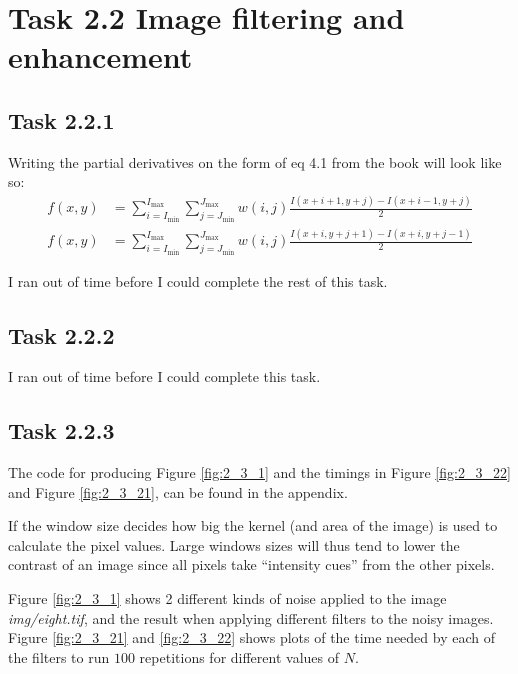\section{Task 2.2 Image filtering and enhancement}

\subsection{Task 2.2.1}

Writing the partial derivatives on the form of eq 4.1 from the book will look
like so:
\begin{align}
  f(x,y) &=
    \sum_{i=I_\text{min}}^{I_\text{max}}
    \sum_{j=J_\text{min}}^{J_\text{max}} w(i,j)
    \frac{I(x+i+1,y+j) - I(x+i-1,y+j)}{2} \\
  f(x,y) &=
    \sum_{i=I_\text{min}}^{I_\text{max}}
    \sum_{j=J_\text{min}}^{J_\text{max}} w(i,j)
    \frac{I(x+i,y+j+1) - I(x+i,y+j-1)}{2}
\end{align}

I ran out of time before I could complete the rest of this task.

\subsection{Task 2.2.2}
I ran out of time before I could complete this task.

\subsection{Task 2.2.3}
The code for producing Figure \ref{fig:2_3_1} and the timings in Figure
\ref{fig:2_3_22} and Figure \ref{fig:2_3_21}, can be found in the appendix.

If the window size decides how big the kernel (and area of the image) is used to
calculate the pixel values.  Large windows sizes will thus tend to lower the
contrast of an image since all pixels take ``intensity cues'' from the other
pixels.

Figure \ref{fig:2_3_1} shows 2 different kinds of noise applied to the image
\textit{img/eight.tif}, and the result when applying different filters to the
noisy images. Figure \ref{fig:2_3_21} and \ref{fig:2_3_22} shows plots of the
time needed by each of the filters to run $100$ repetitions for different values
of $N$.

